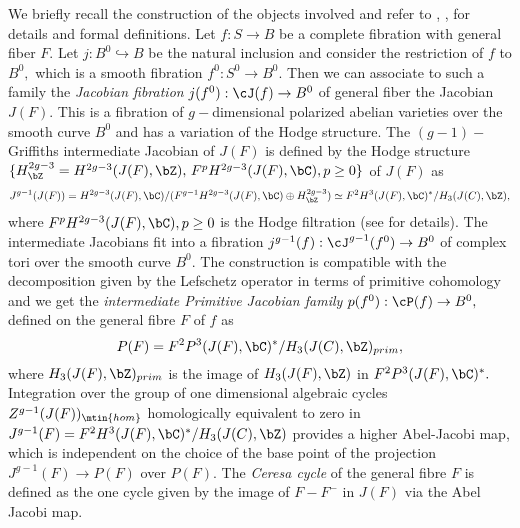 \documentclass[a4paper,11pt]{amsart}
\begin{document}
{ 					 				We briefly recall the construction of the objects involved and refer to \cite{V_HodgeTheoryII_2003}, \cite{Green_InfinitesimalMathods_1994}, \cite{Grif_InfinitesimalVariationsIII_1983} \cite{Vois_UneRemark_1988} for details and formal definitions. Let $f:S\to B$ be a complete fibration with general fiber $F.$ Let $j:B^0\hookrightarrow B$ be the natural inclusion and consider the restriction of $f$ to $B^0,$ which is a smooth fibration $f^0: S^0\to B^0.$ Then we can associate to such a family the {\em  Jacobian fibration} $j(f^0):{\cJ}(f)\to B^0$ of general fiber the Jacobian $J(F).$ This is a fibration of $g-$dimensional polarized abelian varieties over the smooth curve $B^0$ and has a variation of the Hodge structure. The $(g-1)-$Griffiths intermediate Jacobian of $J(F)$ is defined by the  Hodge structure $\{H^{2g-3}_{\bZ}=H^{2g-3}(J(F),\bZ),\,F^pH^{2g-3}(J(F),\bC), p\geq 0\}$ of $J(F)$ as
 					 				\begin{equation}
 					 				J^{g-1}(J(F))=H^{2g-3}(J(F),\bC)/(F^{g-1}H^{2g-3}(J(F),\bC)\oplus H^{2g-3}_{\bZ})\simeq F^2H^3(J(F),\bC)^*/H_3(J(C),\bZ),
 					 				\end{equation} 
 					 				where $F^pH^{2g-3}(J(F),\bC), p\geq 0$ is the Hodge filtration (see \cite{V_HodgeTheoryI_2002} for details).
 					 				The intermediate Jacobians fit into a fibration $j^{g-1}(f):\cJ^{g-1}(f^0)\to B^0$ of complex tori over the smooth curve $B^0.$
 					 				The construction is compatible with the decomposition given by the Lefschetz operator in terms of primitive cohomology and we get the {\em intermediate Primitive Jacobian family }
$p(f^0):\cP(f)\to B^0,$ defined on the general fibre $F$ of $f$ as 
\begin{equation}
P(F)=F^2P^3(J(F),\bC)^*/H_3(J(C),\bZ)_{prim}, 
\end{equation} 
where $H_3(J(F),\bZ)_{prim}$ is the image of $H_3(J(F),\bZ)$ in $F^2P^3(J(F),\bC)^*.$ Integration over the group of one dimensional algebraic cycles $Z^{g-1}(J(F))_{\mtin{hom}}$ homologically equivalent to zero in $J^{g-1}(F)=F^2H^3(J(F),\bC)^*/H_3(J(C),\bZ)$ provides a higher Abel-Jacobi map, which is independent on the choice of the base point of the projection $J^{g-1}(F)\to P(F)$ over $P(F).$ The {\em Ceresa cycle} of the general fibre $F$ is defined as the one cycle given by the image of $F-F^{-}$ in $J(F)$ via the Abel Jacobi map.
}
\end{document}
